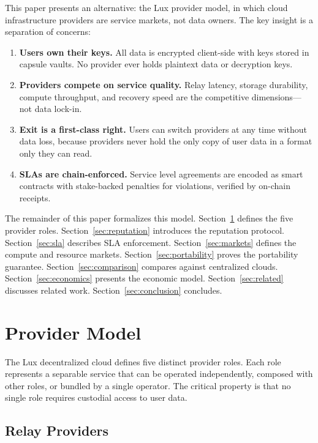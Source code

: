 \documentclass[11pt,a4paper]{article}
\begin{document}
This paper presents an alternative: the Lux provider model, in which cloud
infrastructure providers are service markets, not data owners. The key insight
is a separation of concerns:

\begin{enumerate}[label=(\roman*)]
    \item \textbf{Users own their keys.} All data is encrypted client-side with
    keys stored in capsule vaults. No provider ever holds plaintext data or
    decryption keys.
    \item \textbf{Providers compete on service quality.} Relay latency, storage
    durability, compute throughput, and recovery speed are the competitive
    dimensions---not data lock-in.
    \item \textbf{Exit is a first-class right.} Users can switch providers at
    any time without data loss, because providers never hold the only copy of
    user data in a format only they can read.
    \item \textbf{SLAs are chain-enforced.} Service level agreements are encoded
    as smart contracts with stake-backed penalties for violations, verified by
    on-chain receipts.
\end{enumerate}

The remainder of this paper formalizes this model. Section~\ref{sec:model}
defines the five provider roles. Section~\ref{sec:reputation} introduces
the reputation protocol. Section~\ref{sec:sla} describes SLA enforcement.
Section~\ref{sec:markets} defines the compute and resource markets.
Section~\ref{sec:portability} proves the portability guarantee.
Section~\ref{sec:comparison} compares against centralized clouds.
Section~\ref{sec:economics} presents the economic model.
Section~\ref{sec:related} discusses related work.
Section~\ref{sec:conclusion} concludes.

\section{Provider Model}\label{sec:model}

The Lux decentralized cloud defines five distinct provider roles. Each role
represents a separable service that can be operated independently, composed
with other roles, or bundled by a single operator. The critical property is
that no single role requires custodial access to user data.

\subsection{Relay Providers}
\end{document}
